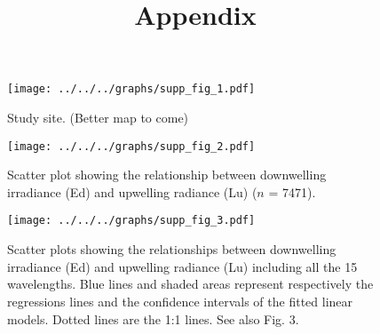 \documentclass[12pt,a4paper]{scrartcl}
\title{Appendix}
\date{}
\begin{document}
    \maketitle

     \begin{figure}[h]
         \centering
         \texttt{[image: ../../../graphs/supp\_fig\_1.pdf]}
         \caption{Study site. (Better map to come)}
     \end{figure}

    \clearpage
    \newpage

    \begin{figure}[h]
        \centering
        \texttt{[image: ../../../graphs/supp\_fig\_2.pdf]}
        \caption{Scatter plot showing the relationship between downwelling irradiance (Ed) and upwelling radiance (Lu) ($n$ = 7471).}
    \end{figure}

    \clearpage
    \newpage

    \begin{figure}[h]
        \centering
        \texttt{[image: ../../../graphs/supp\_fig\_3.pdf]}
        \caption{Scatter plots showing the relationships between downwelling irradiance (Ed) and upwelling radiance (Lu) including all the 15 wavelengths. Blue lines and shaded areas represent respectively the regressions lines and the confidence intervals of the fitted linear models. Dotted lines are the 1:1 lines. See also Fig. 3.}
    \end{figure}

    
\end{document}
